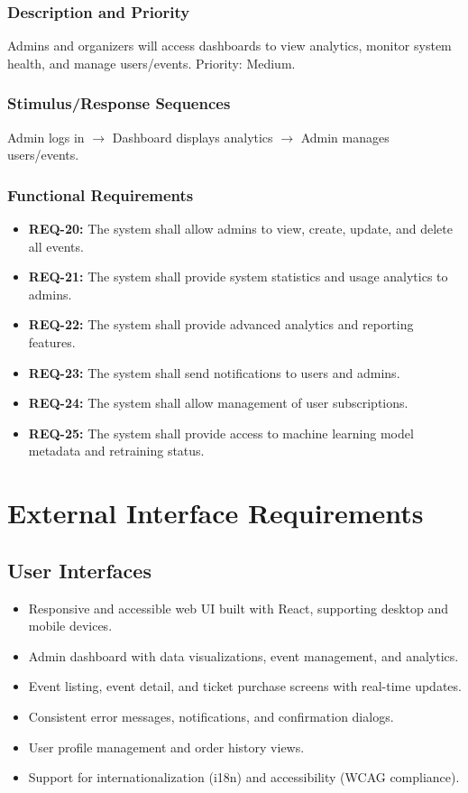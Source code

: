 \documentclass[11pt,a4paper]{article}
\begin{document}
\subsubsection{Description and Priority}
Admins and organizers will access dashboards to view analytics, monitor system health, and manage users/events. Priority: Medium.
\subsubsection{Stimulus/Response Sequences}
Admin logs in $\rightarrow$ Dashboard displays analytics $\rightarrow$ Admin manages users/events.
\subsubsection{Functional Requirements}
\begin{itemize}
    \item \textbf{REQ-20:} The system shall allow admins to view, create, update, and delete all events.
    \item \textbf{REQ-21:} The system shall provide system statistics and usage analytics to admins.
    \item \textbf{REQ-22:} The system shall provide advanced analytics and reporting features.
    \item \textbf{REQ-23:} The system shall send notifications to users and admins.
    \item \textbf{REQ-24:} The system shall allow management of user subscriptions.
    \item \textbf{REQ-25:} The system shall provide access to machine learning model metadata and retraining status.
\end{itemize}

\section{External Interface Requirements}

\subsection{User Interfaces}
\begin{itemize}
    \item Responsive and accessible web UI built with React, supporting desktop and mobile devices.
    \item Admin dashboard with data visualizations, event management, and analytics.
    \item Event listing, event detail, and ticket purchase screens with real-time updates.
    \item Consistent error messages, notifications, and confirmation dialogs.
    \item User profile management and order history views.
    \item Support for internationalization (i18n) and accessibility (WCAG compliance).
\end{itemize}
\end{document}
